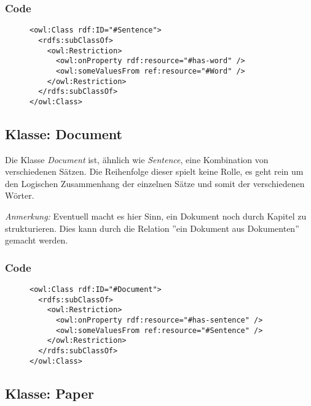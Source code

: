 \documentclass[
    11pt,
    latin1,
    a4paper,
    oneside
]{scrreprt}
\begin{document}
\subsubsection{Code}  \label{sec:class_sentence_code}

\begin{figure}[h]
 \lstset{language=XML}
 \begin{lstlisting}[label=owl:sentence,caption={Die Klasse \emph{Sentence} f\"ugt einzelne W\"orter zu einem Satz zusammen}]
<owl:Class rdf:ID="#Sentence">
  <rdfs:subClassOf>
    <owl:Restriction>
      <owl:onProperty rdf:resource="#has-word" />
      <owl:someValuesFrom ref:resource="#Word" />
    </owl:Restriction>
  </rdfs:subClassOf>
</owl:Class>
 \end{lstlisting}
\end{figure}

\subsection{Klasse: Document} \label{sec:class_document}

Die Klasse \emph{Document} ist, \"ahnlich wie \emph{Sentence}, eine Kombination von verschiedenen S\"atzen. Die Reihenfolge dieser spielt keine Rolle, es geht rein um den Logischen Zusammenhang der einzelnen S\"atze und somit der verschiedenen W\"orter.

\textit{Anmerkung:} Eventuell macht es hier Sinn, ein Dokument noch durch Kapitel zu strukturieren. Dies kann durch die Relation ''ein Dokument aus Dokumenten'' gemacht werden.

\subsubsection{Code}  \label{sec:class_sentence_code}

\begin{figure}[h]
 \lstset{language=XML}
 \begin{lstlisting}[label=owl:document,caption={Die Klasse \emph{Document} f\"ugt einzelne S\"atze zu einem Dokument zusammen}]
<owl:Class rdf:ID="#Document">
  <rdfs:subClassOf>
    <owl:Restriction>
      <owl:onProperty rdf:resource="#has-sentence" />
      <owl:someValuesFrom ref:resource="#Sentence" />
    </owl:Restriction>
  </rdfs:subClassOf>
</owl:Class>
 \end{lstlisting}
\end{figure}


\subsection{Klasse: Paper} \label{sec:class_paper}
\end{document}
